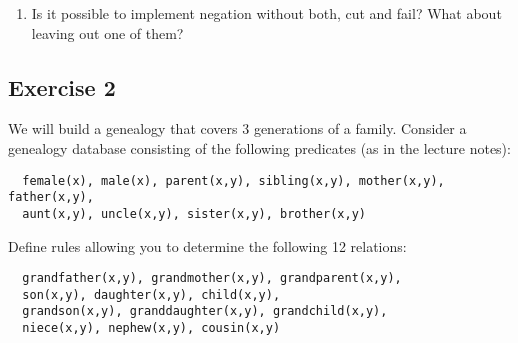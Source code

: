\documentclass [11pt, a4wide, twoside]{article}
\begin{document}
\begin{enumerate}
\item Is it possible to implement negation without both, cut and fail? What about leaving out one of them?

\end{enumerate}

\subsection*{Exercise 2}
We will build a genealogy that covers 3 generations of a family. Consider a genealogy database consisting of the following predicates (as in the lecture notes):
%
\begin{verbatim}
  female(x), male(x), parent(x,y), sibling(x,y), mother(x,y), father(x,y),
  aunt(x,y), uncle(x,y), sister(x,y), brother(x,y)
\end{verbatim}
%
\noindent Define rules allowing you to determine the following 12 relations:
%
\begin{verbatim}
  grandfather(x,y), grandmother(x,y), grandparent(x,y),
  son(x,y), daughter(x,y), child(x,y),
  grandson(x,y), granddaughter(x,y), grandchild(x,y),
  niece(x,y), nephew(x,y), cousin(x,y)
\end{verbatim}


%
%
\end{document}
